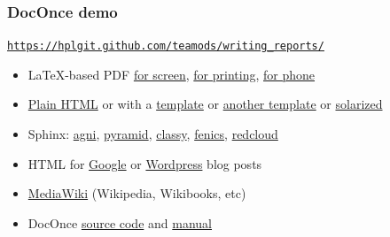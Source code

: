 \documentclass{beamer}
\newcounter{doconce:movie:counter}
\begin{document}
\begin{frame}
\frametitle{DocOnce demo}

\href{{https://hplgit.github.com/teamods/writing_reports/}}{\nolinkurl{https://hplgit.github.com/teamods/writing_reports/}}

\begin{itemize}
 \item LaTeX-based PDF \href{{https://hplgit.github.com/teamods/writing_reports/_static/report.pdf}}{for screen}, \href{{https://hplgit.github.com/teamods/writing_reports/_static/report_4printing.pdf}}{for printing}, \href{{https://hplgit.github.com/teamods/writing_reports/_static/report_4phone.pdf}}{for phone}

 \item \href{{https://hplgit.github.com/teamods/writing_reports/_static/report_do.html}}{Plain HTML} or with a \href{{https://hplgit.github.com/teamods/writing_reports/_static/report_vagrant.html}}{template} or \href{{https://hplgit.github.com/teamods/writing_reports/_static/report_github_minimal.html}}{another template} or \href{{https://hplgit.github.com/teamods/writing_reports/_static/report_solarized.html}}{solarized}

 \item Sphinx: \href{{https://hplgit.github.com/teamods/writing_reports/_static/sphinx-agni/index.html}}{agni}, \href{{https://hplgit.github.com/teamods/writing_reports/_static/sphinx-pyramid/report.html}}{pyramid}, \href{{https://hplgit.github.com/teamods/writing_reports/_static/sphinx-classy/report.html}}{classy}, \href{{https://hplgit.github.com/teamods/writing_reports/_static/sphinx-fenics_minimal/report.html}}{fenics}, \href{{https://hplgit.github.com/teamods/writing_reports/_static/sphinx-fenics_minimal/report.html}}{redcloud}

 \item HTML for \href{{https://doconce-report-demo.blogspot.no/}}{Google} or \href{{https://doconcereportdemo.wordpress.com/}}{Wordpress} blog posts

 \item \href{{https://doconcedemo.shoutwiki.com/wiki/DocOnce_demo_page}}{MediaWiki} (Wikipedia, Wikibooks, etc)

 \item DocOnce \href{{https://hplgit.github.com/teamods/writing_reports/_static/report.do.txt.html}}{source code} and \href{{https://hplgit.github.io/doconce/doc/src/pub/manual/html/manual.html}}{manual}
\end{itemize}

\noindent
\end{frame}
\end{document}
